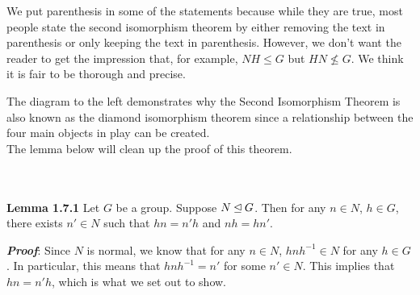     We put parenthesis in some of the statements because
    while they are true, most people state the second isomorphism
    theorem by either removing the text in parenthesis or only keeping
    the text in parenthesis. However, we don't want the reader to get
    the impression that, for example, $NH \le G$ but $HN \not\le G$.
    We think it is fair to be thorough and precise.
    \begin{minipage}{0.25 \textwidth}
        \begin{figure}[H]
        \end{figure}
    \end{minipage} \hfill
    \begin{minipage}{0.7\textwidth}
        The diagram to the left demonstrates why the Second
        Isomorphism Theorem is also known as the diamond isomorphism
        theorem since a relationship between the four main
        objects in play can be created. 
        \\
        The lemma below will clean up the proof of this theorem.
    \end{minipage}  
    \\
    \\

    \noindent\textbf{Lemma 1.7.1} Let $G$ be a group. Suppose
    $N \unlhd G$. Then for any $n \in N$, $h \in
    G$, there exists $n' \in N$ such that $hn = n'h$ and $nh = hn'$.

    \textbf{\textit{Proof}}: Since $N$ is normal, we know that for any
    $n \in N$,
    $hnh^{-1} \in N$ for any $h \in G$. In particular, this means that
    $hnh^{-1} = n'$ for some $n' \in N$. This implies that $hn = n'h$,
    which is what we set out to show.
    \\

